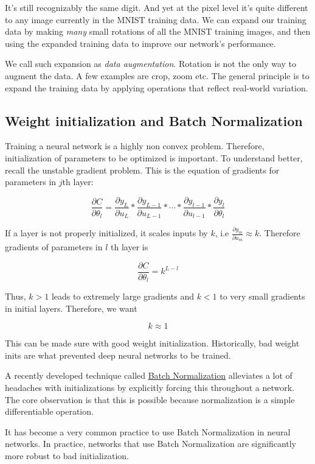 \documentclass[a4paper]{tufte-handout}
\begin{document}
It's still recognizably the same digit. And yet at the pixel level it's
quite different to any image currently in the MNIST training data. We
can expand our training data by making \emph{many} small rotations of
all the MNIST training images, and then using the expanded training data
to improve our network's performance.

We call such expansion as \emph{data augmentation}. Rotation is not the
only way to augment the data. A few examples are crop, zoom etc. The
general principle is to expand the training data by applying operations
that reflect real-world variation.

\subsection{Weight initialization and Batch
Normalization}\label{weight-initialization-and-batch-normalization}

Training a neural network is a highly non convex problem. Therefore,
initialization of parameters to be optimized is important. To understand
better, recall the unstable gradient problem. This is the equation of
gradients for parameters in \(j\)th layer:

\[\frac{\partial C}{\partial \theta_l} = \frac{\partial y_L}{\partial u_L} * \frac{\partial y_{L-1}}{\partial u_{L-1}} * \cdots * \frac{\partial y_{l-1}}{\partial u_{l-1}} * \frac{\partial y_l}{\partial \theta_l}\]

If a layer is not properly initialized, it scales inputs by \(k\), i.e
\(\frac{\partial y_m}{\partial u_m} \approx k\). Therefore gradients of
parameters in \(l\) th layer is

\[\frac{\partial C}{\partial \theta_l} = k^{L - l}\]

Thus, \(k > 1\) leads to extremely large gradients and \(k<1\) to very
small gradients in initial layers. Therefore, we want

\[k \approx 1\]

This can be made sure with good weight initialization. Historically, bad
weight inits are what prevented deep neural networks to be trained.

A recently developed technique called
\href{http://arxiv.org/abs/1502.03167}{Batch Normalization} alleviates a
lot of headaches with initializations by explicitly forcing this
throughout a network. The core observation is that this is possible
because normalization is a simple differentiable operation.

It has become a very common practice to use Batch Normalization in
neural networks. In practice, networks that use Batch Normalization are
significantly more robust to bad initialization.
\end{document}
